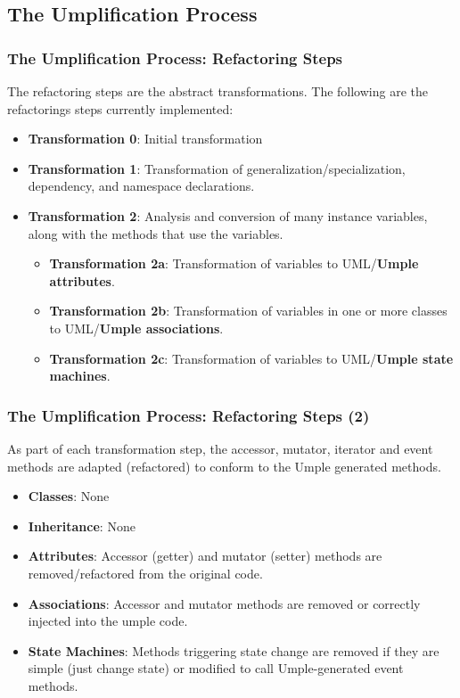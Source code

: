 \documentclass[xcolor=table]{beamer}
\begin{document}
\subsection{The Umplification Process} 

\begin{frame}
\frametitle{The Umplification Process: Refactoring Steps}
The refactoring steps are the abstract transformations. The following are the refactorings steps currently implemented:

\begin{itemize}
\item\textbf{Transformation 0}: Initial transformation
\item\textbf{Transformation 1}: Transformation of generalization/specialization, dependency, and namespace declarations.
\item\textbf{Transformation 2}: Analysis and conversion of many instance variables, along with the methods that use the variables. 
	\begin{itemize}
	\item\textbf{Transformation 2a}: Transformation of variables to UML/\textbf{Umple attributes}.
	\item\textbf{Transformation 2b}: Transformation of variables in one or more classes to UML/\textbf{Umple associations}.
	\item\textbf{Transformation 2c}: Transformation of variables to UML/\textbf{Umple state machines}.
	\end{itemize}
\end{itemize}

\end{frame}

\begin{frame}
\frametitle{The Umplification Process: Refactoring Steps (2)}
As part of each transformation step, the accessor, mutator, iterator and event methods are adapted (refactored) to conform to the Umple generated methods.


\begin{itemize}
\item\textbf{Classes}:  None
\item\textbf{Inheritance}: None
\item\textbf{Attributes}: Accessor (getter) and mutator (setter) methods are removed/refactored from the original code. 
	
\item\textbf{Associations}: Accessor and mutator methods are removed or correctly injected into the umple code.

\item\textbf{State  Machines}: Methods triggering state change are removed if they are simple (just change state) or modified to call Umple-generated event methods. 
\end{itemize}
\end{frame}
\end{document}
